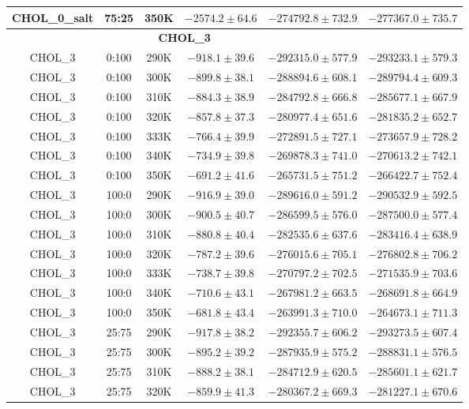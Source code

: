 \begin{longtable}{|c|c|c|c|c|c|}
CHOL\_0\_salt & 75:25 & 350K & $-2574.2 \pm 64.6$ & $-274792.8 \pm 732.9$ & $-277367.0 \pm 735.7$ \\
\midrule \multicolumn{5}{c}{\textbf{CHOL\_3}} \\ \midrule
CHOL\_3 & 0:100 & 290K & $-918.1 \pm 39.6$ & $-292315.0 \pm 577.9$ & $-293233.1 \pm 579.3$ \\
CHOL\_3 & 0:100 & 300K & $-899.8 \pm 38.1$ & $-288894.6 \pm 608.1$ & $-289794.4 \pm 609.3$ \\
CHOL\_3 & 0:100 & 310K & $-884.3 \pm 38.9$ & $-284792.8 \pm 666.8$ & $-285677.1 \pm 667.9$ \\
CHOL\_3 & 0:100 & 320K & $-857.8 \pm 37.3$ & $-280977.4 \pm 651.6$ & $-281835.2 \pm 652.7$ \\
CHOL\_3 & 0:100 & 333K & $-766.4 \pm 39.9$ & $-272891.5 \pm 727.1$ & $-273657.9 \pm 728.2$ \\
CHOL\_3 & 0:100 & 340K & $-734.9 \pm 39.8$ & $-269878.3 \pm 741.0$ & $-270613.2 \pm 742.1$ \\
CHOL\_3 & 0:100 & 350K & $-691.2 \pm 41.6$ & $-265731.5 \pm 751.2$ & $-266422.7 \pm 752.4$ \\
CHOL\_3 & 100:0 & 290K & $-916.9 \pm 39.0$ & $-289616.0 \pm 591.2$ & $-290532.9 \pm 592.5$ \\
CHOL\_3 & 100:0 & 300K & $-900.5 \pm 40.7$ & $-286599.5 \pm 576.0$ & $-287500.0 \pm 577.4$ \\
CHOL\_3 & 100:0 & 310K & $-880.8 \pm 40.4$ & $-282535.6 \pm 637.6$ & $-283416.4 \pm 638.9$ \\
CHOL\_3 & 100:0 & 320K & $-787.2 \pm 39.6$ & $-276015.6 \pm 705.1$ & $-276802.8 \pm 706.2$ \\
CHOL\_3 & 100:0 & 333K & $-738.7 \pm 39.8$ & $-270797.2 \pm 702.5$ & $-271535.9 \pm 703.6$ \\
CHOL\_3 & 100:0 & 340K & $-710.6 \pm 43.1$ & $-267981.2 \pm 663.5$ & $-268691.8 \pm 664.9$ \\
CHOL\_3 & 100:0 & 350K & $-681.8 \pm 43.4$ & $-263991.3 \pm 710.0$ & $-264673.1 \pm 711.3$ \\
CHOL\_3 & 25:75 & 290K & $-917.8 \pm 38.2$ & $-292355.7 \pm 606.2$ & $-293273.5 \pm 607.4$ \\
CHOL\_3 & 25:75 & 300K & $-895.2 \pm 39.2$ & $-287935.9 \pm 575.2$ & $-288831.1 \pm 576.5$ \\
CHOL\_3 & 25:75 & 310K & $-888.2 \pm 38.1$ & $-284712.9 \pm 620.5$ & $-285601.1 \pm 621.7$ \\
CHOL\_3 & 25:75 & 320K & $-859.9 \pm 41.3$ & $-280367.2 \pm 669.3$ & $-281227.1 \pm 670.6$ \\

\end{longtable}
